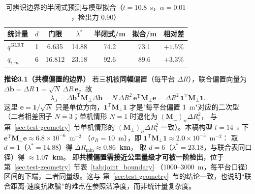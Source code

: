 \documentclass[UTF8,a4paper,zihao=-4]{ctexart}
\begin{document}
\begin{table}[htbp]
\centering\small
\caption{可辨识边界的半闭式预测与模型拟合（\(t=10.8\)~s，\(\alpha=0.01\)，检出力 0.90）}
\label{tab:drmin}
\footnotesize
\begin{tabular}{@{}lcccccc@{}}
\toprule
统计量 & \(d\) & 门限 & \(\lambda^*\) & 半闭式/m & 拟合/m & 相对差\\
\midrule
\(q^{\mathrm{GLRT}}\) & 1 & 6.635 & 14.88 & 74.2 & 73.1 & $+1.5\%$\\
\(q_{i,m}\) & 6 & 16.812 & 23.18 & 92.6 & 89.6 & $+3.3\%$\\
\bottomrule
\end{tabular}
\par{}
\end{table}

\noindent\textbf{推论3.1（共模偏置的边界）}\quad
若三机被\textbf{同幅}偏置（每平台 \(\Delta R\)），联合偏置向量为
\(\Delta\boldsymbol b=\Delta R\,\boldsymbol 1=\sqrt N\,\Delta R\,\boldsymbol e\)，故
\begin{equation}
\lambda_J=\Delta\boldsymbol b^{\mathrm T}\boldsymbol M_\perp\Delta\boldsymbol b
=N\,\Delta R^2\,\boldsymbol e^{\mathrm T}\boldsymbol M_\perp\boldsymbol e
=\Delta R^2\,\boldsymbol 1^{\mathrm T}\boldsymbol M_\perp\boldsymbol 1 .
\label{eq:commom-lambda}
\end{equation}
这里 \(\boldsymbol e=\boldsymbol 1/\sqrt N\) 只是单位方向，\(\boldsymbol 1^{\mathrm T}\boldsymbol M_\perp\boldsymbol 1\)
才是"每平台偏置 1~m"对应的二次型（二者相差因子 \(N=3\)；单机情形 \(N=1\) 时退化为 \((\boldsymbol M_\perp)_{ii}\Delta R_i^2\)，
与第~\ref{sec:test-geometry}~节单机情形的 \((\boldsymbol M_\perp)_{ii}\Delta R_i^2\) 一致）。本稿构型 \(t=14\)~s 下 \(\boldsymbol e^{\mathrm T}\boldsymbol M_\perp\boldsymbol e\approx6.8\times10^{-6}\)~m\(^{-2}\)
（\(\sigma_R=10\)~m），即 \(\boldsymbol 1^{\mathrm T}\boldsymbol M_\perp\boldsymbol 1\approx2.0\times10^{-5}\)~m\(^{-2}\)：
取 \(d=1\)（\(\lambda^*=14.88\)）得 \textbf{\(\Delta R_{\min}\approx0.86\)~km}，
取 \(d=6\)（\(\lambda^*=23.18\)，与联合表同口径）得 \textbf{\(\approx1.07\)~km}。
即\textbf{共模偏置需接近公里量级才可被一阶检出}，位于第~\ref{sec:test-geometry}~节表~\ref{tab:joint_boundary}
（1000--3000~m，每平台口径）区间的下端，二者同量级。这与 第~\ref{sec:test-geometry}~节的结论一致，也说明“联合距离-速度抗欺骗”的难点在参照洁净度，而非统计量复杂度。
\end{document}
